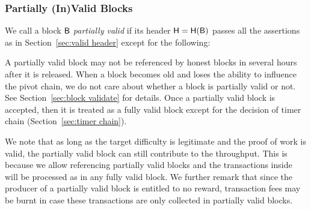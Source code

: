 \subsubsection{Partially (In)Valid Blocks}
\label{sec:pvalid header}

We call a block $\textsf{B}$ \emph{partially valid} if 
its header $\textsf{H}=\textsf{H}(\textsf{B})$ passes all the assertions as in Section~\ref{sec:valid header} except for the following:
\begin{itemize}


\end{itemize}



A partially valid block may not be referenced by honest blocks in several hours after it is released. 
When a block becomes old and loses the ability to influence the pivot chain, we do not care about whether a block is partially valid or not. See Section~\ref{sec:block validate} for details. 
Once a partially valid block is accepted, then it is treated as a fully valid block except for the decision of timer chain (Section~\ref{sec:timer chain}).


We note that as long as the target difficulty is legitimate and the proof of work is valid,
the partially valid block can still contribute to the throughput.
This is because we allow referencing partially valid blocks and the transactions inside will be processed as in any fully valid block.
% 
We further remark that since the producer of a partially valid block is entitled to no reward, transaction fees may be burnt in case these transactions are only collected in partially valid blocks.








